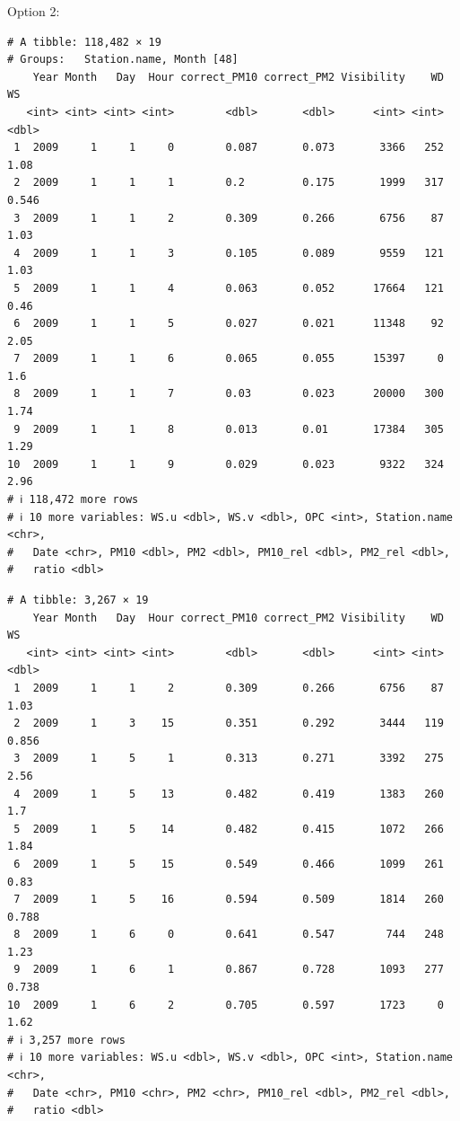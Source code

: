 \documentclass[
]{agujournal2019}
\begin{document}
Option 2:

\begin{verbatim}
# A tibble: 118,482 × 19
# Groups:   Station.name, Month [48]
    Year Month   Day  Hour correct_PM10 correct_PM2 Visibility    WD    WS
   <int> <int> <int> <int>        <dbl>       <dbl>      <int> <int> <dbl>
 1  2009     1     1     0        0.087       0.073       3366   252 1.08 
 2  2009     1     1     1        0.2         0.175       1999   317 0.546
 3  2009     1     1     2        0.309       0.266       6756    87 1.03 
 4  2009     1     1     3        0.105       0.089       9559   121 1.03 
 5  2009     1     1     4        0.063       0.052      17664   121 0.46 
 6  2009     1     1     5        0.027       0.021      11348    92 2.05 
 7  2009     1     1     6        0.065       0.055      15397     0 1.6  
 8  2009     1     1     7        0.03        0.023      20000   300 1.74 
 9  2009     1     1     8        0.013       0.01       17384   305 1.29 
10  2009     1     1     9        0.029       0.023       9322   324 2.96 
# ℹ 118,472 more rows
# ℹ 10 more variables: WS.u <dbl>, WS.v <dbl>, OPC <int>, Station.name <chr>,
#   Date <chr>, PM10 <dbl>, PM2 <dbl>, PM10_rel <dbl>, PM2_rel <dbl>,
#   ratio <dbl>
\end{verbatim}

\begin{verbatim}
# A tibble: 3,267 × 19
    Year Month   Day  Hour correct_PM10 correct_PM2 Visibility    WD    WS
   <int> <int> <int> <int>        <dbl>       <dbl>      <int> <int> <dbl>
 1  2009     1     1     2        0.309       0.266       6756    87 1.03 
 2  2009     1     3    15        0.351       0.292       3444   119 0.856
 3  2009     1     5     1        0.313       0.271       3392   275 2.56 
 4  2009     1     5    13        0.482       0.419       1383   260 1.7  
 5  2009     1     5    14        0.482       0.415       1072   266 1.84 
 6  2009     1     5    15        0.549       0.466       1099   261 0.83 
 7  2009     1     5    16        0.594       0.509       1814   260 0.788
 8  2009     1     6     0        0.641       0.547        744   248 1.23 
 9  2009     1     6     1        0.867       0.728       1093   277 0.738
10  2009     1     6     2        0.705       0.597       1723     0 1.62 
# ℹ 3,257 more rows
# ℹ 10 more variables: WS.u <dbl>, WS.v <dbl>, OPC <int>, Station.name <chr>,
#   Date <chr>, PM10 <chr>, PM2 <chr>, PM10_rel <dbl>, PM2_rel <dbl>,
#   ratio <dbl>
\end{verbatim}
\end{document}

